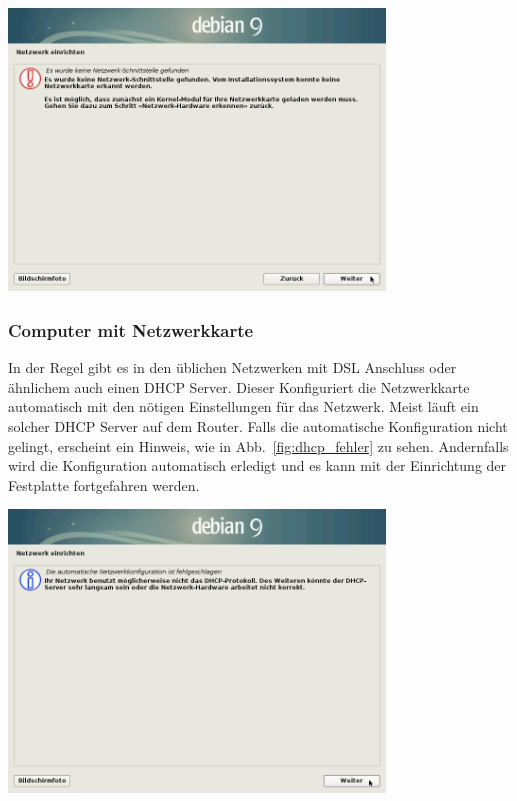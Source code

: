 \documentclass[a4paper,12pt,twoside]{article}
\begin{document}
\bigskip
\begin{minipage}{\linewidth}
  \centering
  \captionsetup{type=figure}
  \includegraphics[width=10cm]{screenshots/message_no_network.png}
  \label{fig:inst_best_netzwerkkarte}
\end{minipage}


\subsubsection{Computer mit Netzwerkkarte}
\label{sct:inst_mit_netzwerk}
In der Regel gibt es in den üblichen Netzwerken mit DSL Anschluss oder
ähnlichem auch einen DHCP Server. Dieser Konfiguriert die Netzwerkkarte
automatisch mit den nötigen Einstellungen für das Netzwerk. Meist läuft
ein solcher DHCP Server auf dem Router. Falls die automatische
Konfiguration nicht gelingt, erscheint ein Hinweis, wie in
Abb.~\ref{fig:dhcp_fehler} zu sehen. Andernfalls wird die Konfiguration
automatisch erledigt und es kann mit der Einrichtung der Festplatte
fortgefahren werden.

\bigskip
\begin{minipage}{\textwidth}
    \centering
    \captionsetup{type=figure}
    \includegraphics[width=10cm]{screenshots/message_dhcp_failed.png}
    \label{fig:dhcp_fehler}
\end{minipage}
\bigskip
\end{document}
